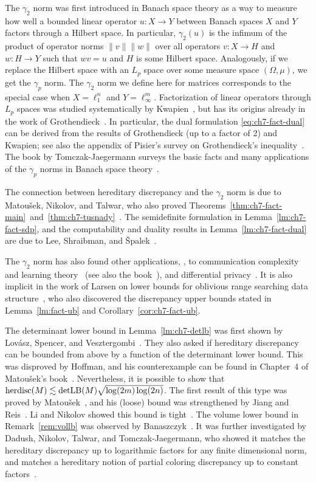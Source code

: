 The $\gamma_2$ norm was first introduced in Banach space theory as a
way to measure how well a bounded linear operator $u:X \to Y$ between
Banach spaces $X$ and $Y$ factors through a Hilbert space. In
particular, $\gamma_2(u)$ is the infimum of the product of operator
norms $\|v\|\|w\|$ over all operators $v:X \to H$ and $w:H \to Y$ such
that $wv = u$ and $H$ is some Hilbert space. Analogously, if we
replace the Hilbert space with an $L_p$ space over some measure space
$(\Omega,\mu)$, we get the $\gamma_p$ norm. The $\gamma_2$ norm we
define here for matrices corresponds to the special case when $X =
\ell_1^n$ and $Y = \ell_\infty^m$.
Factorization of linear operators through
$L_p$ spaces was studied systematically by Kwapien~\cite{Kwapien72},
but has its origins already in the work of
Grothendieck~\cite{Grothendieck52}. In particular, the dual formulation
\eqref{eq:ch7-fact-dual} can be derived from the results of
Grothendieck (up to a factor of 2) and Kwapien; see also the appendix
of Pisier's survey on Grothendieck's inequality~\cite{Pisier-grothendieck}. The book by
Tomczak-Jaegermann surveys the basic facts and many
applications of the $\gamma_p$ norms in Banach space theory~\cite{Tomczak-Jaegermann}.

The connection between hereditary discrepancy and the $\gamma_2$ norm
is due to Matou\v{s}ek, Nikolov, and Talwar, who also proved
Theorems~\ref{thm:ch7-fact-main}~and~\ref{thm:ch7-tusnady}~\cite{MNT}. The
semidefinite formulation in Lemma~\ref{lm:ch7-fact-sdp}, and the
computability and duality results in Lemma~\ref{lm:ch7-fact-dual} are
due to Lee, Shraibman, and \v{S}palek~\cite{LeeSS08}. 

The $\gamma_2$ norm has also found other applications, \eg, to
communication complexity and learning
theory~\cite{LinialMSS07-signmatrices} (see also the
book~\cite{LeeS09}), and differential privacy~\cite{NTZ}. It is also
implicit in the work of Larsen on lower bounds for oblivious range
searching data structure~\cite{disc-larsen}, who also discovered the discrepancy upper
bounds stated in Lemma~\ref{lm:fact-ub} and
Corollary~\ref{cor:ch7-fact-ub}.

The determinant lower bound in Lemma~\ref{lm:ch7-detlb} was first
shown by Lov\'asz, Spencer, and Vesztergombi~\cite{LSV}. They also asked
if hereditary discrepancy can be bounded from above by a function of
the determinant lower bound. This was disproved by Hoffman, and his
counterexample can be found in Chapter~4 of Matou\v{s}ek's
book~\cite{matousek2010geometric}. Nevertheless, it is possible to
show that $\operatorname{herdisc}(M) \lesssim
\operatorname{detLB}(M)\sqrt{\log(2m)\log(2n)}$. The first result of this type
was proved by Matou\v{s}ek~\cite{Matousek-detlb}, and his (loose)
bound was strengthened by Jiang and
Reis~\cite{JiangReis22}.  Li and Nikolov showed this bound is
tight~\cite{LiNikolov24}. 
The volume
lower bound in Remark~\ref{rem:vollb} was observed by
Banaszczyk~\cite{Bana93}. It was further investigated by Dadush, Nikolov,
Talwar, and Tomczak-Jaegermann, who showed it matches the hereditary
discrepancy up to logarithmic factors for any finite dimensional norm,
and matches a hereditary notion of partial coloring discrepancy up to
constant factors~\cite{anynorm}.


